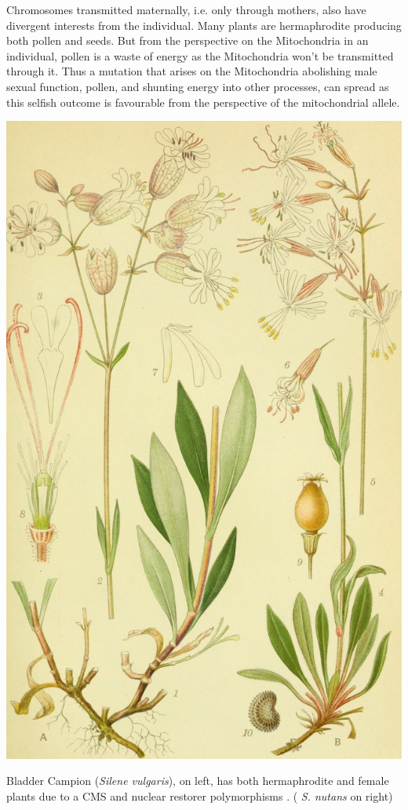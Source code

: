 {Chromosomes transmitted maternally, i.e. only through mothers, also have divergent
interests from the individual. Many plants are hermaphrodite producing
both pollen and seeds. But from the perspective on the Mitochondria in
an individual, pollen is a waste of energy as the Mitochondria won't
be transmitted through it. Thus a mutation that arises on the
Mitochondria abolishing male sexual function, pollen, and shunting energy into
other processes, can spread as this selfish outcome is favourable from the perspective
of the mitochondrial allele.  \begin{marginfigure}
\begin{center}
\includegraphics[width= \textwidth]{illustration_images/single_locus_selection/Silene_vulgaris/20184393949_9e22db5ff4_k.jpg}
\end{center}
\caption{Bladder Campion  ({\it Silene vulgaris}), on left, has both 
hermaphrodite and female plants due to a CMS and nuclear
restorer polymorphisms \citep{charlesworth1998male}. ({\it
    S. nutans} on right)  } \label{fig:Hypolimnas_bolina}
\end{marginfigure}  %

}
